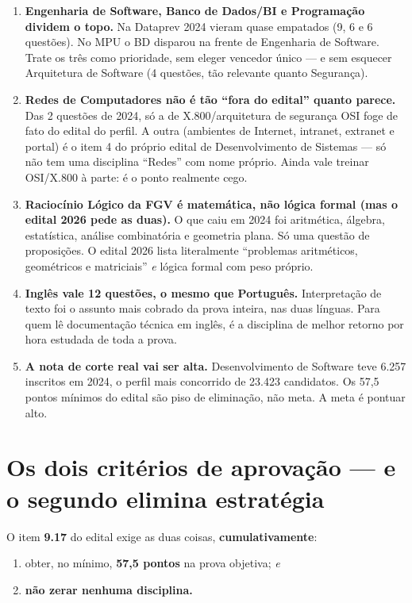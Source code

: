 \begin{enumerate}
\item \textbf{Engenharia de Software, Banco de Dados/BI e Programação dividem
o topo.} Na Dataprev 2024 vieram quase empatados (9, 6 e 6 questões). No MPU
o BD disparou na frente de Engenharia de Software. Trate os três como
prioridade, sem eleger vencedor único --- e sem esquecer Arquitetura de
Software (4 questões, tão relevante quanto Segurança).
\item \textbf{Redes de Computadores não é tão ``fora do edital'' quanto
parece.} Das 2 questões de 2024, só a de X.800/arquitetura de segurança OSI
foge de fato do edital do perfil. A outra (ambientes de Internet, intranet,
extranet e portal) é o item 4 do próprio edital de Desenvolvimento de
Sistemas --- só não tem uma disciplina ``Redes'' com nome próprio. Ainda
vale treinar OSI/X.800 à parte: é o ponto realmente cego.
\item \textbf{Raciocínio Lógico da FGV é matemática, não lógica formal (mas
o edital 2026 pede as duas).} O que caiu em 2024 foi aritmética, álgebra,
estatística, análise combinatória e geometria plana. Só uma questão de
proposições. O edital 2026 lista literalmente ``problemas aritméticos,
geométricos e matriciais'' \emph{e} lógica formal com peso próprio.
\item \textbf{Inglês vale 12 questões, o mesmo que Português.} Interpretação
de texto foi o assunto mais cobrado da prova inteira, nas duas línguas. Para
quem lê documentação técnica em inglês, é a disciplina de melhor retorno por
hora estudada de toda a prova.
\item \textbf{A nota de corte real vai ser alta.} Desenvolvimento de
Software teve 6.257 inscritos em 2024, o perfil mais concorrido de 23.423
candidatos. Os 57,5 pontos mínimos do edital são piso de eliminação, não
meta. A meta é pontuar alto.
\end{enumerate}

\section{Os dois critérios de aprovação --- e o segundo elimina estratégia}

O item \textbf{9.17} do edital exige as duas coisas, \textbf{cumulativamente}:

\begin{enumerate}
\item obter, no mínimo, \textbf{57,5 pontos} na prova objetiva; \emph{e}
\item \textbf{não zerar nenhuma disciplina.}
\end{enumerate}

